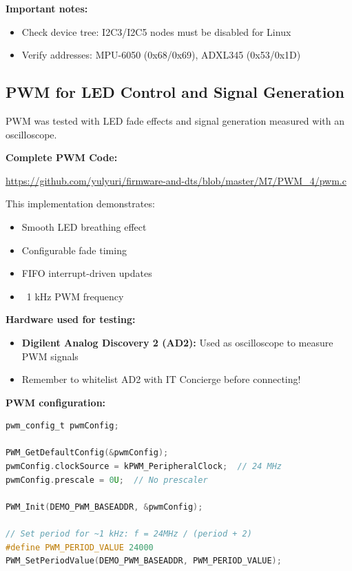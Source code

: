 \documentclass[12pt,a4paper]{report}
\begin{document}
\textbf{Important notes:}
\begin{itemize}
    \item Check device tree: I2C3/I2C5 nodes must be disabled for Linux
    \item Verify addresses: MPU-6050 (0x68/0x69), ADXL345 (0x53/0x1D)
\end{itemize}

\subsection{PWM for LED Control and Signal Generation}

PWM was tested with LED fade effects and signal generation measured with an oscilloscope.

\begin{gitref}
\textbf{Complete PWM Code:}

\url{https://github.com/yulyuri/firmware-and-dts/blob/master/M7/PWM_4/pwm.c}

This implementation demonstrates:
\begin{itemize}
    \item Smooth LED breathing effect
    \item Configurable fade timing
    \item FIFO interrupt-driven updates
    \item ~1 kHz PWM frequency
\end{itemize}
\end{gitref}

\textbf{Hardware used for testing:}
\begin{itemize}
    \item \textbf{Digilent Analog Discovery 2 (AD2):} Used as oscilloscope to measure PWM signals
    \item Remember to whitelist AD2 with IT Concierge before connecting!
\end{itemize}


\textbf{PWM configuration:}
\begin{lstlisting}[language=c]
pwm_config_t pwmConfig;

PWM_GetDefaultConfig(&pwmConfig);
pwmConfig.clockSource = kPWM_PeripheralClock;  // 24 MHz
pwmConfig.prescale = 0U;  // No prescaler

PWM_Init(DEMO_PWM_BASEADDR, &pwmConfig);

// Set period for ~1 kHz: f = 24MHz / (period + 2)
#define PWM_PERIOD_VALUE 24000
PWM_SetPeriodValue(DEMO_PWM_BASEADDR, PWM_PERIOD_VALUE);
\end{lstlisting}
\end{document}
